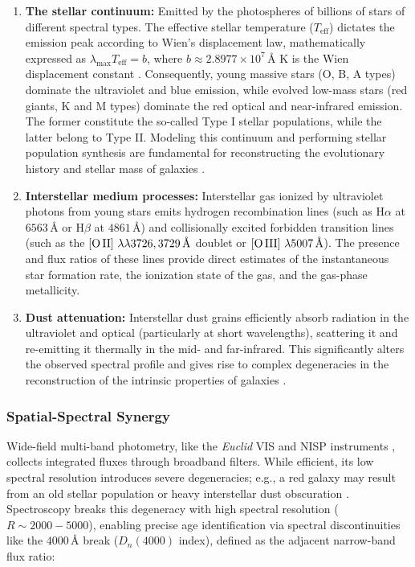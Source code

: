 \begin{enumerate}
\item \textbf{The stellar continuum:} Emitted by the photospheres of billions of stars of different spectral types. The effective stellar temperature ($T_{\text{eff}}$) dictates the emission peak according to Wien's displacement law, mathematically expressed as $\lambda_{\text{max}} T_{\text{eff}} = b$, where $b \approx 2.8977 \times 10^7\,\text{\AA{} K}$ is the Wien displacement constant \autocite{ar:wien-1894}. Consequently, young massive stars (O, B, A types) dominate the ultraviolet and blue emission, while evolved low-mass stars (red giants, K and M types) dominate the red optical and near-infrared emission. The former constitute the so-called Type I stellar populations, while the latter belong to Type II. Modeling this continuum and performing stellar population synthesis are fundamental for reconstructing the evolutionary history and stellar mass of galaxies \autocites{ar:bruzual-charlot}{ar:conroy-2013}.

\item \textbf{Interstellar medium processes:} Interstellar gas ionized by ultraviolet photons from young stars emits hydrogen recombination lines (such as $\text{H}\alpha$ at $6563\,\text{\AA{}}$ or $\text{H}\beta$ at $4861\,\text{\AA{}}$) and collisionally excited forbidden transition lines (such as the $\left[\text{O\,II}\right]\,\lambda\lambda 3726, 3729\,\text{\AA{}}$ doublet or $\left[\text{O\,III}\right]\,\lambda 5007\,\text{\AA{}}$). The presence and flux ratios of these lines provide direct estimates of the instantaneous star formation rate, the ionization state of the gas, and the gas-phase metallicity.

\item \textbf{Dust attenuation:} Interstellar dust grains efficiently absorb radiation in the ultraviolet and optical (particularly at short wavelengths), scattering it and re-emitting it thermally in the mid- and far-infrared. This significantly alters the observed spectral profile and gives rise to complex degeneracies in the reconstruction of the intrinsic properties of galaxies \autocites{ar:cardelli-1989}{ar:calzetti-2000}.
\end{enumerate}

\subsubsection{Spatial-Spectral Synergy}

Wide-field multi-band photometry, like the \textit{Euclid} VIS and NISP instruments \autocites{ar:mellier-2024}{ar:cropper-2024}{ar:jahnke-2025}, collects integrated fluxes through broadband filters. While efficient, its low spectral resolution introduces severe degeneracies; e.g., a red galaxy may result from an old stellar population or heavy interstellar dust obscuration \autocites{ar:worthey-1994}{ar:conroy-2013}. Spectroscopy breaks this degeneracy with high spectral resolution ($R \sim 2000 - 5000$), enabling precise age identification via spectral discontinuities like the $4000\,\si{\angstrom}$ break ($D_n\left(4000\right)$ index), defined as the adjacent narrow-band flux ratio:

